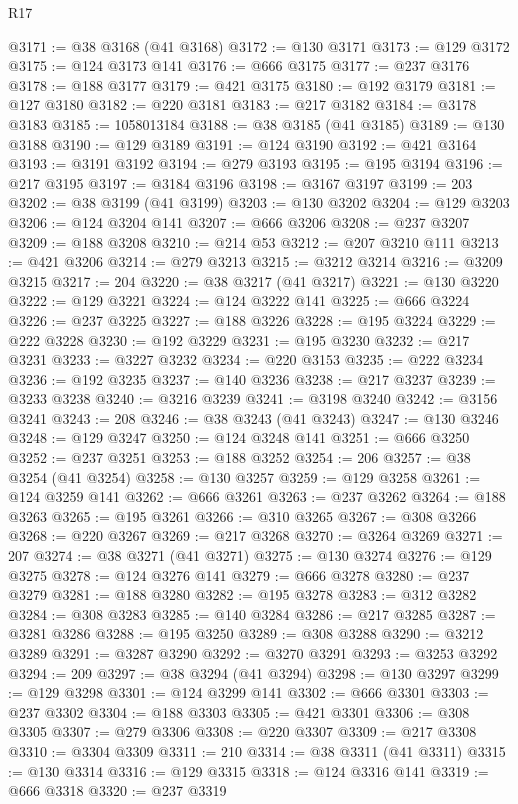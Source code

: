 \begin{lexlean}{R17}
\begin{coremodule}
@3171 := @38 @3168 (@41 @3168)
@3172 := @130 @3171
@3173 := @129 @3172
@3175 := @124 @3173 @141
@3176 := @666 @3175
@3177 := @237 @3176
@3178 := @188 @3177
@3179 := @421 @3175
@3180 := @192 @3179
@3181 := @127 @3180
@3182 := @220 @3181
@3183 := @217 @3182
@3184 := @3178 @3183
@3185 := 1058013184
@3188 := @38 @3185 (@41 @3185)
@3189 := @130 @3188
@3190 := @129 @3189
@3191 := @124 @3190
@3192 := @421 @3164
@3193 := @3191 @3192
@3194 := @279 @3193
@3195 := @195 @3194
@3196 := @217 @3195
@3197 := @3184 @3196
@3198 := @3167 @3197
@3199 := 203
@3202 := @38 @3199 (@41 @3199)
@3203 := @130 @3202
@3204 := @129 @3203
@3206 := @124 @3204 @141
@3207 := @666 @3206
@3208 := @237 @3207
@3209 := @188 @3208
@3210 := @214 @53
@3212 := @207 @3210 @111
@3213 := @421 @3206
@3214 := @279 @3213
@3215 := @3212 @3214
@3216 := @3209 @3215
@3217 := 204
@3220 := @38 @3217 (@41 @3217)
@3221 := @130 @3220
@3222 := @129 @3221
@3224 := @124 @3222 @141
@3225 := @666 @3224
@3226 := @237 @3225
@3227 := @188 @3226
@3228 := @195 @3224
@3229 := @222 @3228
@3230 := @192 @3229
@3231 := @195 @3230
@3232 := @217 @3231
@3233 := @3227 @3232
@3234 := @220 @3153
@3235 := @222 @3234
@3236 := @192 @3235
@3237 := @140 @3236
@3238 := @217 @3237
@3239 := @3233 @3238
@3240 := @3216 @3239
@3241 := @3198 @3240
@3242 := @3156 @3241
@3243 := 208
@3246 := @38 @3243 (@41 @3243)
@3247 := @130 @3246
@3248 := @129 @3247
@3250 := @124 @3248 @141
@3251 := @666 @3250
@3252 := @237 @3251
@3253 := @188 @3252
@3254 := 206
@3257 := @38 @3254 (@41 @3254)
@3258 := @130 @3257
@3259 := @129 @3258
@3261 := @124 @3259 @141
@3262 := @666 @3261
@3263 := @237 @3262
@3264 := @188 @3263
@3265 := @195 @3261
@3266 := @310 @3265
@3267 := @308 @3266
@3268 := @220 @3267
@3269 := @217 @3268
@3270 := @3264 @3269
@3271 := 207
@3274 := @38 @3271 (@41 @3271)
@3275 := @130 @3274
@3276 := @129 @3275
@3278 := @124 @3276 @141
@3279 := @666 @3278
@3280 := @237 @3279
@3281 := @188 @3280
@3282 := @195 @3278
@3283 := @312 @3282
@3284 := @308 @3283
@3285 := @140 @3284
@3286 := @217 @3285
@3287 := @3281 @3286
@3288 := @195 @3250
@3289 := @308 @3288
@3290 := @3212 @3289
@3291 := @3287 @3290
@3292 := @3270 @3291
@3293 := @3253 @3292
@3294 := 209
@3297 := @38 @3294 (@41 @3294)
@3298 := @130 @3297
@3299 := @129 @3298
@3301 := @124 @3299 @141
@3302 := @666 @3301
@3303 := @237 @3302
@3304 := @188 @3303
@3305 := @421 @3301
@3306 := @308 @3305
@3307 := @279 @3306
@3308 := @220 @3307
@3309 := @217 @3308
@3310 := @3304 @3309
@3311 := 210
@3314 := @38 @3311 (@41 @3311)
@3315 := @130 @3314
@3316 := @129 @3315
@3318 := @124 @3316 @141
@3319 := @666 @3318
@3320 := @237 @3319

\end{coremodule}
\end{lexlean}
